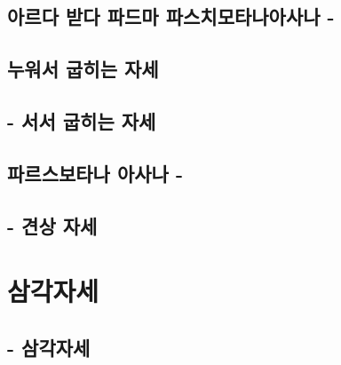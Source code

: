 \documentclass[12pt, a4paper, oneside]{book}
\let\stdsection\section
\renewcommand\section{\newpage\stdsection}
\begin{document}
%
%
%
	\section{아르다 받다 파드마 파스치모타나아사나 - }

%
%
%
	\section{누워서 굽히는 자세}


%
%
%
	\section{ - 서서 굽히는 자세}


%
%
%
	\section{파르스보타나 아사나 - }

%
%
%
	\section{ - 견상 자세 }


	\chapter{삼각자세}
	\newpage
	\minitoc

			\section{ - 삼각자세 }
\end{document}
